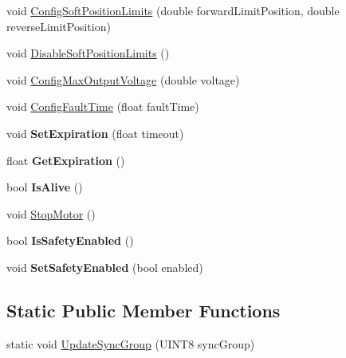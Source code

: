 \begin{DoxyCompactItemize}
\item 
void \hyperlink{classCANJaguar_a388b3188432b3e7d7d73b29ba7e61b8f}{\-Config\-Soft\-Position\-Limits} (double forward\-Limit\-Position, double reverse\-Limit\-Position)
\item 
void \hyperlink{classCANJaguar_ae291e933f69ddd35a7b0da83520596d9}{\-Disable\-Soft\-Position\-Limits} ()
\item 
void \hyperlink{classCANJaguar_a82e172281e9c452d31b881693288a6ae}{\-Config\-Max\-Output\-Voltage} (double voltage)
\item 
void \hyperlink{classCANJaguar_a25d6360eb331a6e24b36cfbf8911e914}{\-Config\-Fault\-Time} (float fault\-Time)
\item 
\hypertarget{classCANJaguar_aa7de5a947804cc2233a8246b9801e025}{void {\bfseries \-Set\-Expiration} (float timeout)}\label{classCANJaguar_aa7de5a947804cc2233a8246b9801e025}

\item 
\hypertarget{classCANJaguar_afa39a3fa4e710f40466e47b51d3eb889}{float {\bfseries \-Get\-Expiration} ()}\label{classCANJaguar_afa39a3fa4e710f40466e47b51d3eb889}

\item 
\hypertarget{classCANJaguar_acd27267ca0452efd67384664ee8ce4c4}{bool {\bfseries \-Is\-Alive} ()}\label{classCANJaguar_acd27267ca0452efd67384664ee8ce4c4}

\item 
void \hyperlink{classCANJaguar_a5ce4840f1e80913836cfb2ddb2d7d50b}{\-Stop\-Motor} ()
\item 
\hypertarget{classCANJaguar_a7a74176fcaa2689cb28b43f6b01397ae}{bool {\bfseries \-Is\-Safety\-Enabled} ()}\label{classCANJaguar_a7a74176fcaa2689cb28b43f6b01397ae}

\item 
\hypertarget{classCANJaguar_a0a8faf4d9564c4d78dd3177b6dd66f90}{void {\bfseries \-Set\-Safety\-Enabled} (bool enabled)}\label{classCANJaguar_a0a8faf4d9564c4d78dd3177b6dd66f90}

\end{DoxyCompactItemize}
\subsection*{\-Static \-Public \-Member \-Functions}
\begin{DoxyCompactItemize}
\item 
static void \hyperlink{classCANJaguar_afbd06237b0fbdd5b35cdb7452937269e}{\-Update\-Sync\-Group} (\-U\-I\-N\-T8 sync\-Group)
\end{DoxyCompactItemize}
